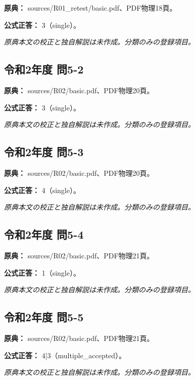 \noindent\textbf{原典：} sources/R01\_retest/basic.pdf、PDF物理18頁。

\textbf{公式正答：} 3（single）。

\par\textit{原典本文の校正と独自解説は未作成。分類のみの登録項目。}

\subsection{令和2年度 問5-2}
\label{q:r02-reg-basic-5-2}

\noindent\textbf{原典：} sources/R02/basic.pdf、PDF物理20頁。

\textbf{公式正答：} 3（single）。

\par\textit{原典本文の校正と独自解説は未作成。分類のみの登録項目。}

\subsection{令和2年度 問5-3}
\label{q:r02-reg-basic-5-3}

\noindent\textbf{原典：} sources/R02/basic.pdf、PDF物理20頁。

\textbf{公式正答：} 4（single）。

\par\textit{原典本文の校正と独自解説は未作成。分類のみの登録項目。}

\subsection{令和2年度 問5-4}
\label{q:r02-reg-basic-5-4}

\noindent\textbf{原典：} sources/R02/basic.pdf、PDF物理21頁。

\textbf{公式正答：} 1（single）。

\par\textit{原典本文の校正と独自解説は未作成。分類のみの登録項目。}

\subsection{令和2年度 問5-5}
\label{q:r02-reg-basic-5-5}

\noindent\textbf{原典：} sources/R02/basic.pdf、PDF物理21頁。

\textbf{公式正答：} 4|3（multiple\_accepted）。

\par\textit{原典本文の校正と独自解説は未作成。分類のみの登録項目。}

